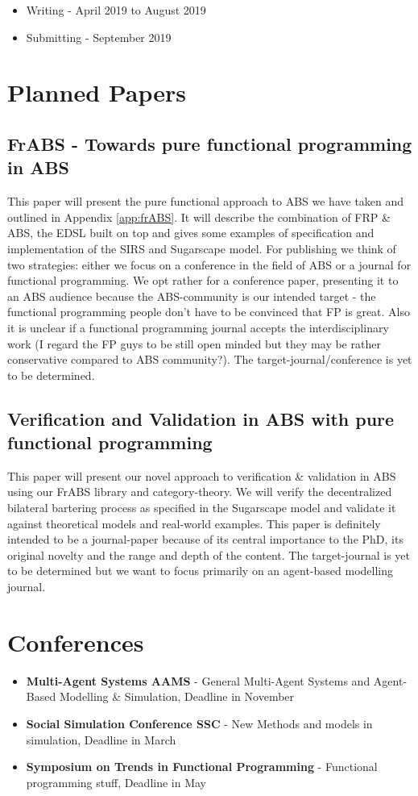 \begin{itemize}
\item Writing - April 2019 to August 2019
\item Submitting - September 2019
\end{itemize}

\section{Planned Papers}
\subsection{FrABS - Towards pure functional programming in ABS}
This paper will present the pure functional approach to ABS we have taken and outlined in Appendix \ref{app:frABS}. It will describe the combination of FRP \& ABS, the EDSL built on top and gives some examples of specification and implementation of the SIRS and Sugarscape model. 
For publishing we think of two strategies: either we focus on a conference in the field of ABS or a journal for functional programming. We opt rather for a conference paper, presenting it to an ABS audience because the ABS-community is our intended target - the functional programming people don't have to be convinced that FP is great. Also it is unclear if a functional programming journal accepts the interdisciplinary work (I regard the FP guys to be still open minded but they may be rather conservative compared to ABS community?). The target-journal/conference is yet to be determined.

\subsection{Verification and Validation in ABS with pure functional programming}
This paper will present our novel approach to verification \& validation in ABS using our FrABS library and category-theory. We will verify the decentralized bilateral bartering process as specified in the Sugarscape model and validate it against theoretical models and real-world examples. This paper is definitely intended to be a journal-paper because of its central importance to the PhD, its original novelty and the range and depth of the content. The target-journal is yet to be determined but we want to focus primarily on an agent-based modelling journal.

\section{Conferences}
\begin{itemize}
	\item \textbf{Multi-Agent Systems AAMS} - General Multi-Agent Systems and Agent-Based Modelling \& Simulation, Deadline in November
	\item \textbf{Social Simulation Conference SSC} - New Methods and models in simulation, Deadline in March
	\item \textbf{Symposium on Trends in Functional Programming} - Functional programming stuff, Deadline in May
\end{itemize}

